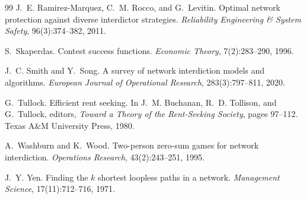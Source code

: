 \documentclass[11pt,a4paper]{article}
\theoremstyle{plain}
\theoremstyle{definition}
\begin{document}
\begin{thebibliography}{99}
J.~E. Ramirez-Marquez, C.~M. Rocco, and G.~Levitin.
\newblock Optimal network protection against diverse interdictor strategies.
\newblock \emph{Reliability Engineering \& System Safety}, 96(3):374--382, 2011.

S.~Skaperdas.
\newblock Contest success functions.
\newblock \emph{Economic Theory}, 7(2):283--290, 1996.

J.~C. Smith and Y.~Song.
\newblock A survey of network interdiction models and algorithms.
\newblock \emph{European Journal of Operational Research}, 283(3):797--811, 2020.

G.~Tullock.
\newblock Efficient rent seeking.
\newblock In J.~M. Buchanan, R.~D. Tollison, and G.~Tullock, editors, \emph{Toward a Theory of the Rent-Seeking Society}, pages 97--112. Texas A\&M University Press, 1980.

A.~Washburn and K.~Wood.
\newblock Two-person zero-sum games for network interdiction.
\newblock \emph{Operations Research}, 43(2):243--251, 1995.

J.~Y. Yen.
\newblock Finding the $k$ shortest loopless paths in a network.
\newblock \emph{Management Science}, 17(11):712--716, 1971.

\end{thebibliography}
\end{document}
